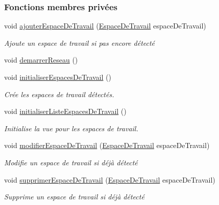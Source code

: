 \subsubsection*{Fonctions membres privées}
\begin{DoxyCompactItemize}
\item 
void \hyperlink{classcom_1_1lasalle_1_1meeting_1_1_i_h_m_meeting_ad9ff630d7dc8df0155e3a552bfdfed75}{ajouter\+Espace\+De\+Travail} (\hyperlink{classcom_1_1lasalle_1_1meeting_1_1_espace_de_travail}{Espace\+De\+Travail} espace\+De\+Travail)
\begin{DoxyCompactList}\small\item\em Ajoute un espace de travail si pas encore détecté \end{DoxyCompactList}\item 
void \hyperlink{classcom_1_1lasalle_1_1meeting_1_1_i_h_m_meeting_ab9ef4bd3436aa480f92a5b1922fd6666}{demarrer\+Reseau} ()
\item 
void \hyperlink{classcom_1_1lasalle_1_1meeting_1_1_i_h_m_meeting_ad4660f416b16b6df0f96d58f4c36b6f6}{initialiser\+Espaces\+De\+Travail} ()
\begin{DoxyCompactList}\small\item\em Crée les espaces de travail détectés. \end{DoxyCompactList}\item 
void \hyperlink{classcom_1_1lasalle_1_1meeting_1_1_i_h_m_meeting_a6624feade3dc156bc7eb40f79cb47267}{initialiser\+Liste\+Espaces\+De\+Travail} ()
\begin{DoxyCompactList}\small\item\em Initialise la vue pour les espaces de travail. \end{DoxyCompactList}\item 
void \hyperlink{classcom_1_1lasalle_1_1meeting_1_1_i_h_m_meeting_a3367c0a9b9743ca7808cb2265789f9b8}{modifier\+Espace\+De\+Travail} (\hyperlink{classcom_1_1lasalle_1_1meeting_1_1_espace_de_travail}{Espace\+De\+Travail} espace\+De\+Travail)
\begin{DoxyCompactList}\small\item\em Modifie un espace de travail si déjà détecté \end{DoxyCompactList}\item 
void \hyperlink{classcom_1_1lasalle_1_1meeting_1_1_i_h_m_meeting_a1418ee16ded8b09f4c4a9c1a9359163a}{supprimer\+Espace\+De\+Travail} (\hyperlink{classcom_1_1lasalle_1_1meeting_1_1_espace_de_travail}{Espace\+De\+Travail} espace\+De\+Travail)
\begin{DoxyCompactList}\small\item\em Supprime un espace de travail si déjà détecté \end{DoxyCompactList}\item 

\end{DoxyCompactItemize}
